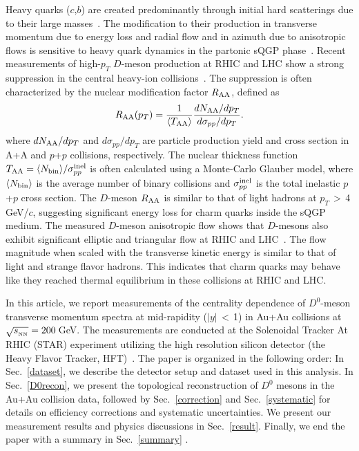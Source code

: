 \documentclass[%
 reprint,	
 amsmath,amssymb,
 aps,
 prc,
]{revtex4-1}
\begin{document}
Heavy quarks ($c$,$b$) are created predominantly through initial hard scatterings due to their large masses~\cite{Ziwei_Lin,Cacciari}. The modification to their production in transverse momentum due to energy loss and radial flow and in azimuth due to anisotropic flows is sensitive to heavy quark dynamics in the partonic sQGP phase~\cite{Moore}. Recent measurements of high-$p_{T}$ $D$-meson production at RHIC and LHC show a strong suppression in the central heavy-ion collisions~\cite{Alice_D_RAA_1,Alice_D_RAA_2,CMS_D_RAA_5TeV,Star_D_RAA}. The suppression is often characterized by the nuclear modification factor $R_{\rm AA}$, defined as
\begin{equation}
  R_{\rm AA}(p_T) = \frac{1}{\langle T_{\rm AA}\rangle} \frac{dN_{\rm AA}/dp_{T}}{d\sigma_{pp}/dp_{T}}.
\label{equ:equation0}
\end{equation}
where $dN_{\rm AA}/dp_T$ and $d\sigma_{pp}/dp_T$ are particle production yield and cross section in A+A and $p$+$p$ collisions, respectively. The nuclear thickness function $T_{\rm AA}=\langle N_{\rm bin}\rangle/\sigma_{pp}^{\rm inel}$ is often calculated using a Monte-Carlo Glauber model, where $\langle N_{\rm bin}\rangle$ is the average number of binary collisions and $\sigma_{pp}^{\rm inel}$ is the total inelastic $p$+$p$ cross section.
The $D$-meson $R_{\rm AA}$ is similar to that of light hadrons at $p_{T}$$\,>$\,4\,GeV/$c$, suggesting significant energy loss for charm quarks inside the sQGP medium. The measured $D$-meson anisotropic flow shows that $D$-mesons also exhibit significant elliptic and triangular flow at RHIC and LHC~\cite{Alice_D_v2_276TeV_PRL,Alice_D_v2_276TeV_PRC,CMS_D_vn_5TeV,Star_D_v2}. The flow magnitude when scaled with the transverse kinetic energy is similar to that of light and strange flavor hadrons. This indicates that charm quarks may behave like they reached thermal equilibrium in these collisions at RHIC and LHC.

In this article, we report measurements of the centrality dependence of $D^0$-meson transverse momentum spectra at mid-rapidity ($|y|$\,$<$\,1) in Au+Au collisions at $\sqrt{s_{_{\rm NN}}} = 200$\,GeV. The measurements are conducted at the Solenoidal Tracker At RHIC (STAR) experiment utilizing the high resolution silicon detector (the Heavy Flavor Tracker, HFT)~\cite{Contin:2017mck}. The paper is organized in the following order: In Sec.~\ref{dataset}, we describe the detector setup and dataset used in this analysis. In Sec.~\ref{D0recon}, we present the topological reconstruction of $D^0$ mesons in the Au+Au collision data, followed by Sec.~\ref{correction} and Sec.~\ref{systematic} for details on efficiency corrections and systematic uncertainties. We present our measurement results and physics discussions in Sec.~\ref{result}. Finally, we end the paper with a summary in Sec.~\ref{summary} .
\end{document}

